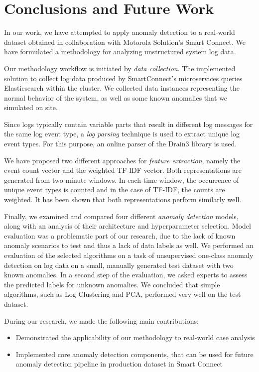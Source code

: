 \chapter{Conclusions and Future Work}
\label{conclusion}
In our work, we have attempted to apply anomaly detection to a real-world dataset obtained in collaboration with Motorola Solution's Smart Connect. We have formulated a methodology for analyzing unstructured system log data. 

Our methodology workflow is initiated by \textit{data collection}. The implemented solution to collect log data produced by SmartConnect's microservices queries Elasticsearch within the cluster. We collected data instances representing the normal behavior of the system, as well as some known anomalies that we simulated on site.

Since logs typically contain variable parts that result in different log messages for the same log event type, a \textit{log parsing} technique is used to extract unique log event types. For this purpose, an online parser of the Drain3 library is used. 

We have proposed two different approaches for \textit{feature extraction}, namely the event count vector and the weighted TF-IDF vector. Both representations are generated from two minute windows. In each time window, the occurrence of unique event types is counted and in the case of TF-IDF, the counts are weighted. It has been shown that both representations perform similarly well.

Finally, we examined and compared four different \textit{anomaly detection} models, along with an analysis of their architecture and hyperparameter selection. Model evaluation was a problematic part of our research, due to the lack of known anomaly scenarios to test and thus a lack of data labels as well. We performed an evaluation of the selected algorithms on a task of unsupervised one-class anomaly detection on log data on a small, manually generated test dataset with two known anomalies. In a second step of the evaluation, we asked experts to assess the predicted labels for unknown anomalies. We concluded that simple algorithms, such as Log Clustering and PCA, performed very well on the test dataset.

During our research, we made the following main contributions:

\begin{itemize}
    \item Demonstrated the applicability of our methodology to real-world case analysis
    \item Implemented core anomaly detection components, that can be used for future anomaly detection pipeline in production dataset in Smart Connect
\end{itemize}

